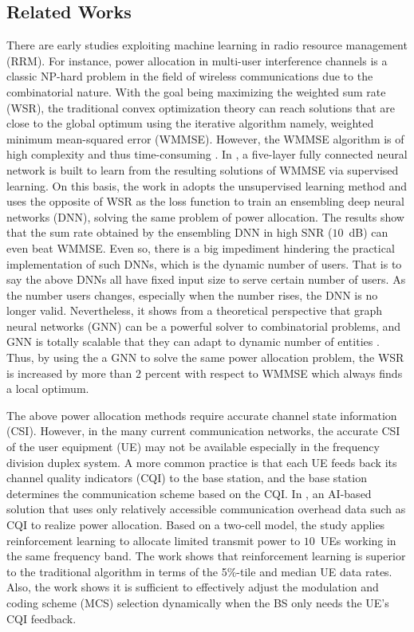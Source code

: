 \documentclass[conference,compsocconf]{IEEEtran}
\begin{document}
	\subsection{Related Works}
	There are early studies exploiting machine learning in radio resource management (RRM). For instance, power allocation in multi-user interference channels is a classic NP-hard problem in the field of wireless communications due to the combinatorial nature. With the goal being maximizing the weighted sum rate (WSR), the traditional convex optimization theory can reach solutions that are close to the global optimum using the iterative algorithm namely, weighted minimum mean-squared error (WMMSE). However, the WMMSE algorithm is of high complexity and thus time-consuming \cite{shi2011iteratively}. In \cite{sun2018learning}, a five-layer fully connected neural network is built to learn from the resulting solutions of WMMSE via supervised learning. On this basis, the work in \cite{liang2018towards} adopts the unsupervised learning method and uses the opposite of WSR as the loss function to train an ensembling deep neural networks (DNN), solving the same problem of power allocation. The results show that the sum rate obtained by the ensembling DNN in high SNR ($10$~dB) can even beat WMMSE. Even so, there is a big impediment hindering the practical implementation of such DNNs, which is the dynamic number of users. That is to say the above DNNs all have fixed input size to serve certain number of users. As the number users changes, especially when the number rises, the DNN is no longer valid. Nevertheless, it shows from a theoretical perspective that graph neural networks (GNN) can be a powerful solver to combinatorial problems, and GNN is totally scalable that they can adapt to dynamic number of entities \cite{sato2019approximation}. Thus, by using the a GNN to solve the same power allocation problem, the WSR is increased by more than 2 percent with respect to WMMSE which always finds a local optimum.
	
	The above power allocation methods require accurate channel state information (CSI). However, in the many current communication networks, the accurate CSI of the user equipment (UE) may not be available especially in the frequency division duplex system. A more common practice is that each UE feeds back its channel quality indicators (CQI) to the base station, and the base station determines the communication scheme based on the CQI. In \cite{ghadimi2017reinforcement}, an AI-based solution that uses only relatively accessible communication overhead data such as CQI to realize power allocation. Based on a two-cell model, the study applies reinforcement learning to allocate limited transmit power to $10$~UEs working in the same frequency band. The work shows that reinforcement learning is superior to the traditional algorithm in terms of the 5\%-tile and median UE data rates. Also, the work \cite{bruno2014robust} shows it is sufficient to effectively adjust the modulation and coding scheme (MCS) selection dynamically when the BS only needs the UE's CQI feedback.
	
\end{document}
